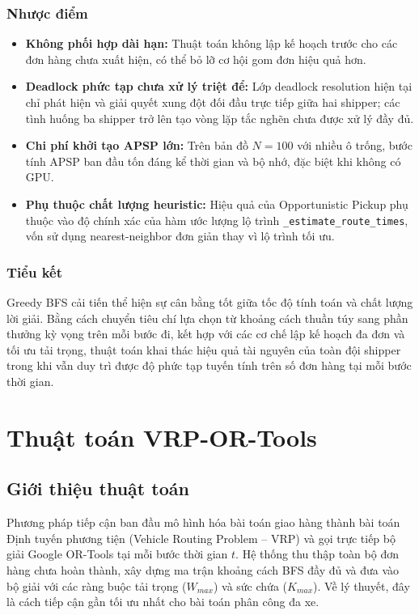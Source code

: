 \documentclass[conference]{IEEEtran}
\begin{document}
\subsubsection{Nhược điểm}
\begin{itemize}
    \item \textbf{Không phối hợp dài hạn:} Thuật toán không lập kế hoạch trước cho các đơn hàng chưa xuất hiện, có thể bỏ lỡ cơ hội gom đơn hiệu quả hơn.
    \item \textbf{Deadlock phức tạp chưa xử lý triệt để:} Lớp deadlock resolution hiện tại chỉ phát hiện và giải quyết xung đột đối đầu trực tiếp giữa hai shipper; các tình huống ba shipper trở lên tạo vòng lặp tắc nghẽn chưa được xử lý đầy đủ.
    \item \textbf{Chi phí khởi tạo APSP lớn:} Trên bản đồ $N = 100$ với nhiều ô trống, bước tính APSP ban đầu tốn đáng kể thời gian và bộ nhớ, đặc biệt khi không có GPU.
    \item \textbf{Phụ thuộc chất lượng heuristic:} Hiệu quả của Opportunistic Pickup phụ thuộc vào độ chính xác của hàm ước lượng lộ trình \texttt{\_estimate\_route\_times}, vốn sử dụng nearest-neighbor đơn giản thay vì lộ trình tối ưu.
\end{itemize}
 
\subsubsection{Tiểu kết}
Greedy BFS cải tiến thể hiện sự cân bằng tốt giữa tốc độ tính toán và chất lượng lời giải. Bằng cách chuyển tiêu chí lựa chọn từ khoảng cách thuần túy sang phần thưởng kỳ vọng trên mỗi bước đi, kết hợp với các cơ chế lập kế hoạch đa đơn và tối ưu tải trọng, thuật toán khai thác hiệu quả tài nguyên của toàn đội shipper trong khi vẫn duy trì được độ phức tạp tuyến tính trên số đơn hàng tại mỗi bước thời gian.
 

\section{Thuật toán VRP-OR-Tools}
 
\subsection{Giới thiệu thuật toán}
Phương pháp tiếp cận ban đầu mô hình hóa bài toán giao hàng thành bài toán Định tuyến phương tiện (Vehicle Routing Problem -- VRP) và gọi trực tiếp bộ giải Google OR-Tools tại mỗi bước thời gian $t$. Hệ thống thu thập toàn bộ đơn hàng chưa hoàn thành, xây dựng ma trận khoảng cách BFS đầy đủ và đưa vào bộ giải với các ràng buộc tải trọng ($W_{max}$) và sức chứa ($K_{max}$). Về lý thuyết, đây là cách tiếp cận gần tối ưu nhất cho bài toán phân công đa xe.
 
\end{document}
